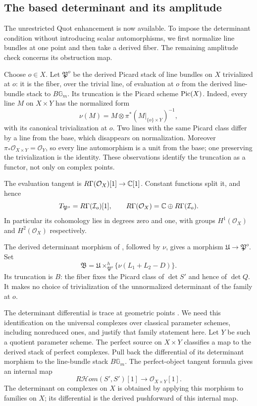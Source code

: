 \subsection{The based determinant and its amplitude}

The unrestricted Quot enhancement is now available. To impose the
determinant condition without introducing scalar automorphisms, we
first normalize line bundles at one point and then take a derived
fiber. The remaining amplitude check concerns its obstruction map.

Choose $o\in X$.  Let $\mathfrak P^o$ be the derived Picard stack of line
bundles on $X$ trivialized at $o$: it is the fiber, over the trivial line,
of evaluation at $o$ from the derived line-bundle stack to
$B\mathbb G_m$.  Its truncation is the Picard scheme $\operatorname{Pic}(X)$.
Indeed, every line $M$ on $X\times Y$ has the normalized form
\[
\nu(M)=M\otimes\pi^*(M|_{\{o\}\times Y})^{-1},
\]
with its canonical trivialization at $o$.  Two lines with the same
Picard class differ by a line from the base, which disappears on
normalization.  Moreover $\pi_*\mathcal O_{X\times Y}=\mathcal O_Y$,
so every line automorphism is a unit from the base; one preserving the
trivialization is the identity.  These observations identify the
truncation as a functor, not only on complex points.

The evaluation tangent is $R\Gamma(\mathcal O_X)[1]\to\mathbb C[1]$.
Constant functions split it, and hence
\begin{equation}\label{der:based-picard}
T_{\mathfrak P^o}=R\Gamma(\mathcal I_o)[1],\qquad
R\Gamma(\mathcal O_X)=\mathbb C\oplus R\Gamma(\mathcal I_o).
\end{equation}
In particular its cohomology lies in degrees zero and one, with groups
$H^1(\mathcal O_X)$ and $H^2(\mathcal O_X)$ respectively.

The derived determinant morphism of \cite[Section~3.1,
Proposition~3.2]{STV}, followed by $\nu$, gives a morphism
$\mathfrak U\to\mathfrak P^o$.  Set
\begin{equation}\label{der:derived-fiber}
\mathfrak B=
\mathfrak U\mathbin{\times^h_{\mathfrak P^o}}
\{\nu(L_1+L_2-D)\}.
\end{equation}
Its truncation is $B$: the fiber fixes the Picard class of $\det S'$
and hence of $\det Q$.  It makes no choice of trivialization of the
unnormalized determinant of the family at $o$.

The determinant differential is trace at geometric points
\cite[Proposition~3.2]{STV}. We need this identification on the
universal complexes over classical parameter schemes, including
nonreduced ones, and justify that family statement here.
Let $Y$ be such a quotient parameter scheme. The perfect source on
$X\times Y$ classifies a map to the derived stack of perfect complexes.
Pull back the differential of its determinant morphism to the
line-bundle stack $B\mathbb G_m$. The perfect-object tangent formula
gives an internal map
\[
 R\mathcal{H}om(S',S')[1]\longrightarrow\mathcal O_{X\times Y}[1].
\]
The determinant on complexes on $X$ is obtained by applying this
morphism to families on $X$; its differential is the derived pushforward
of this internal map.


